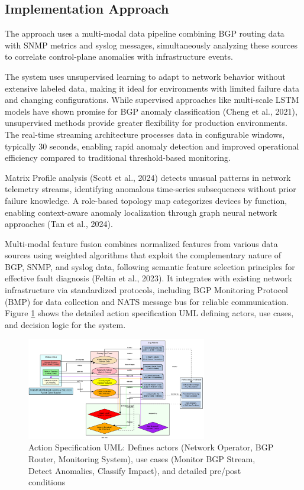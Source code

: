 \documentclass[11pt]{article}
\begin{document}
\subsection{Implementation Approach}

The approach uses a multi-modal data pipeline combining BGP routing data with SNMP metrics and syslog messages, simultaneously analyzing these sources to correlate control-plane anomalies with infrastructure events.

The system uses unsupervised learning to adapt to network behavior without extensive labeled data, making it ideal for environments with limited failure data and changing configurations. While supervised approaches like multi-scale LSTM models have shown promise for BGP anomaly classification (Cheng et al., 2021), unsupervised methods provide greater flexibility for production environments. The real-time streaming architecture processes data in configurable windows, typically 30 seconds, enabling rapid anomaly detection and improved operational efficiency compared to traditional threshold-based monitoring.

Matrix Profile analysis (Scott et al., 2024) detects unusual patterns in network telemetry streams, identifying anomalous time-series subsequences without prior failure knowledge. A role-based topology map categorizes devices by function, enabling context-aware anomaly localization through graph neural network approaches (Tan et al., 2024).

Multi-modal feature fusion combines normalized features from various data sources using weighted algorithms that exploit the complementary nature of BGP, SNMP, and syslog data, following semantic feature selection principles for effective fault diagnosis (Feltin et al., 2023). It integrates with existing network infrastructure via standardized protocols, including BGP Monitoring Protocol (BMP) for data collection and NATS message bus for reliable communication. Figure \ref{fig:action_spec} shows the detailed action specification UML defining actors, use cases, and decision logic for the system.

\begin{figure}[h]
\centering
\includegraphics[width=0.7\textwidth]{action_specification.png}
\caption{Action Specification UML: Defines actors (Network Operator, BGP Router, Monitoring System), use cases (Monitor BGP Stream, Detect Anomalies, Classify Impact), and detailed pre/post conditions}
\label{fig:action_spec}
\end{figure}
\end{document}

